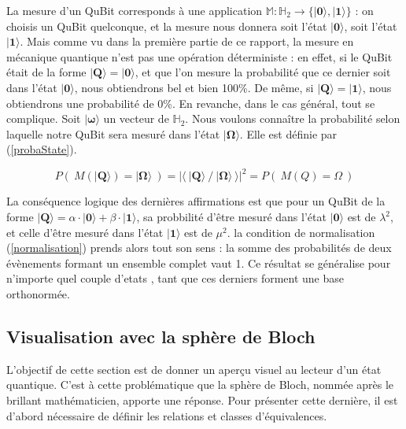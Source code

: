 \documentclass[a4paper,12pt]{report}
\newcommand{\prodSc}[2]{\langle #1 / #2 \rangle}
\newcommand{\quSt}[1]{\bm{|#1\rangle}}
\begin{document}
\par{
	La mesure d'un QuBit corresponds à une application $\mathbb{M} : \mathbb{H}_{2} \rightarrow \{ \quSt{0}, \quSt{1} \}$ : on choisis un QuBit quelconque, et la mesure nous donnera soit l'état $\quSt{0}$, soit l'état $\quSt{1}$. Mais comme vu dans la première partie de ce rapport, la mesure en mécanique quantique n'est pas une opération déterministe : en effet, si le QuBit était de la forme $\quSt{Q} = \quSt{0}$, et que l'on mesure la probabilité que ce dernier soit dans l'état $\quSt{0}$, nous obtiendrons bel et bien 100\%. De même, si $\quSt{Q} = \quSt{1}$, nous obtiendrons une probabilité de 0\%. En revanche, dans le cas général, tout se complique. Soit $\quSt{\omega}$ un vecteur de $\mathbb{H}_{2}$. Nous voulons connaître la probabilité selon laquelle notre QuBit sera mesuré dans l'état $\quSt{\Omega}$. Elle est définie par (\ref{probaState}).
}

\begin{equation} \label{probaState}
	P(~ M( \quSt{Q} ) = \quSt{\Omega} ~) = | \langle ~ \quSt{Q} ~/~  \quSt{\Omega} ~\rangle |^2 = P(~ M( Q ) = \Omega ~)
\end{equation}

\vspace{1\baselineskip}

\par{
	La conséquence logique des dernières affirmations est que pour un QuBit de la forme $\quSt{Q} = \alpha \cdot \quSt{0} + \beta \cdot \quSt{1}$, sa probbilité d'être mesuré dans l'état $\quSt{0}$ est de $\lambda^2$, et celle d'être mesuré dans l'état $\quSt{1}$ est de $\mu^2$. la condition de normalisation (\ref{normalisation}) prends alors tout son sens : la somme des probabilités de deux évènements formant un ensemble complet vaut 1. Ce résultat se généralise pour n'importe quel couple d'etats , tant que ces derniers forment une base orthonormée.
}

		\subsection{Visualisation avec la sphère de Bloch}

\par{
	L'objectif de cette section est de donner un aperçu visuel au lecteur d'un état quantique. C'est à cette problématique que la sphère de Bloch, nommée après le brillant mathématicien, apporte une réponse. Pour présenter cette dernière, il est d'abord nécessaire de définir les relations et classes d'équivalences. \\
}
\end{document}
